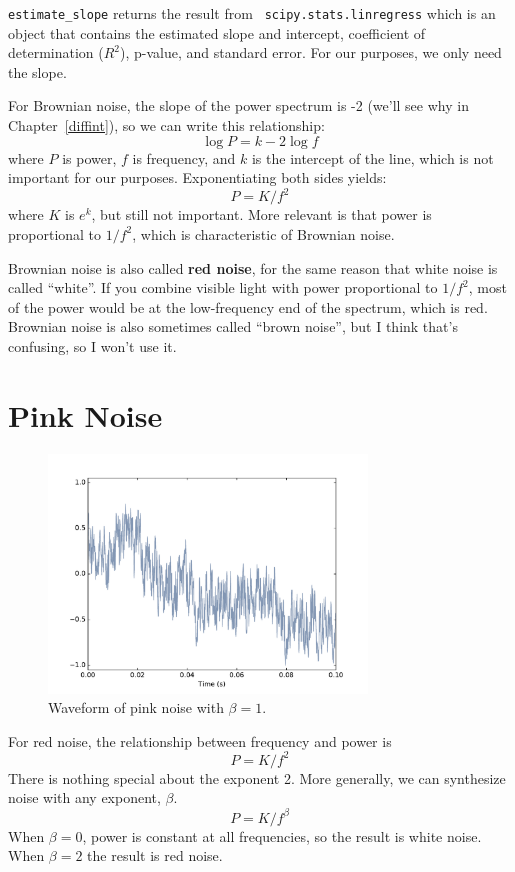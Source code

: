 \documentclass[12pt]{book}
\begin{document}
\verb"estimate_slope" returns the result from {\tt
  scipy.stats.linregress} which is an object that contains the
estimated slope and intercept, coefficient of determination ($R^2$),
p-value, and standard error.  For our purposes, we only need the
slope.

For Brownian noise, the slope of the power spectrum is -2 (we'll see
why in Chapter~\ref{diffint}), so we can write this relationship:
%
\[ \log P = k -2 \log f \]
%
where $P$ is power, $f$ is frequency, and $k$ is the intercept
of the line, which is not important for our purposes.
Exponentiating both sides yields:
%
\[ P = K / f^{2} \]
%
where $K$ is $e^k$, but still not important.  More relevant is
that power is proportional to $1/f^2$, which is characteristic
of Brownian noise.

Brownian noise is also called {\bf red noise}, for the same reason that
white noise is called ``white''.  If you combine visible light with
power proportional to $1/f^2$, most of the power
would be at the low-frequency end of the spectrum, which is red.
Brownian noise is also sometimes called ``brown noise'', but I think
that's confusing, so I won't use it.



\section{Pink Noise}
\label{pink}

\begin{figure}
\centerline{\includegraphics[height=2.5in]{figs/pinknoise0.pdf}}
\caption{Waveform of pink noise with $\beta=1$.}
\label{fig.pinknoise0}
\end{figure}

For red noise, the relationship between frequency
and power is
%
\[ P = K / f^{2} \]
%
There is nothing special about the exponent 2.  More generally,
we can synthesize noise with any exponent, $\beta$.
%
\[ P = K / f^{\beta} \]
%
When $\beta = 0$, power is constant at all frequencies,
so the result is white noise.  When $\beta=2$ the result is red noise.
\end{document}
